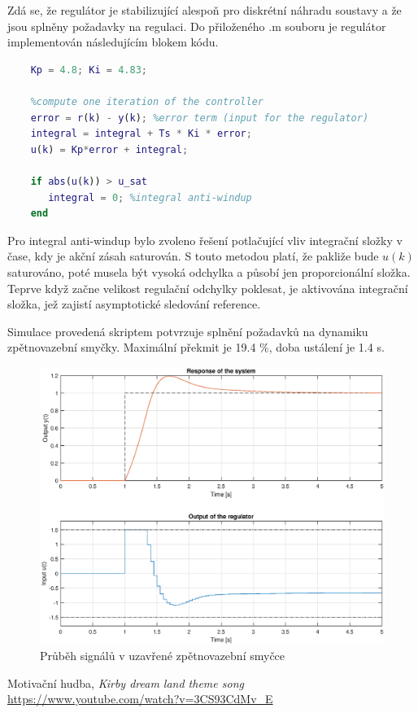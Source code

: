 \documentclass[twoside]{article}
\begin{document}
Zdá se, že regulátor je stabilizující alespoň pro diskrétní náhradu soustavy a že jsou splněny požadavky na regulaci.
Do přiloženého .m souboru je regulátor implementován následujícím blokem kódu.

\begin{lstlisting}[language=Matlab]
    %constants of the regulator:
    Kp = 4.8; Ki = 4.83;
    
    %compute one iteration of the controller
    error = r(k) - y(k); %error term (input for the regulator)
    integral = integral + Ts * Ki * error;
    u(k) = Kp*error + integral;
    
    if abs(u(k)) > u_sat
       integral = 0; %integral anti-windup
    end
\end{lstlisting}

Pro integral anti-windup bylo zvoleno řešení potlačující vliv integrační složky v čase, kdy je akční zásah saturován.
S touto metodou platí, že pakliže bude $u(k)$ saturováno, poté musela být vysoká odchylka a působí jen proporcionální složka.
Teprve když začne velikost regulační odchylky poklesat, je aktivována integrační složka, jež zajistí asymptotické sledování reference.

Simulace provedená skriptem potvrzuje splnění požadavků na dynamiku zpětnovazební smyčky.
Maximální překmit je 19.4 \%, doba ustálení je 1.4 \si{\second}.

\begin{figure}[htbp]
	\centering
	\includegraphics[width=\linewidth]{odezva_spojity.eps}
	\caption{Průběh signálů v uzavřené zpětnovazební smyčce}
	\label{fig:vysledek}
\end{figure}



\begin{thebibliography}{9}

		Motivační hudba, \emph{Kirby dream land theme song} \url{https://www.youtube.com/watch?v=3CS93CdMv_E}
	
	\end{thebibliography}
\end{document}
